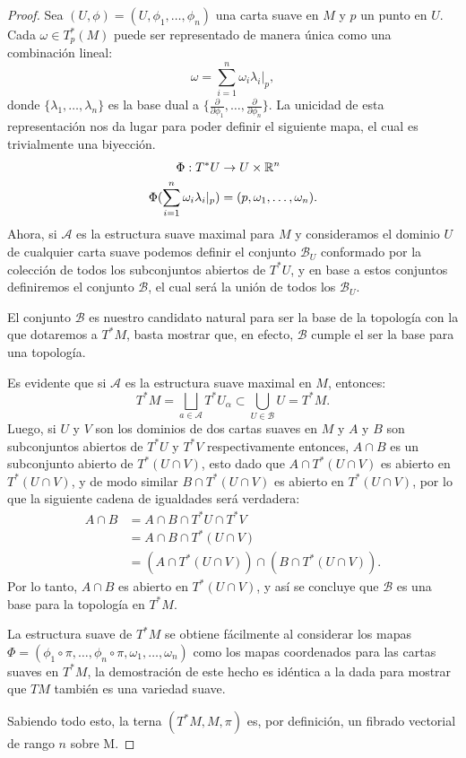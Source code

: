 \begin{proof}
	Sea $(U,\phi) = (U,\phi_1, \ldots, \phi_n)$ una carta suave en $M$ y $p$ un punto en $U$. Cada $\omega \in T_{p}^{*}(M)$ puede ser representado de manera única como una combinación lineal:
	\[
		\omega = \sum_{i=1}^{n} \omega_i \lambda_i |_p,
	\]
	donde $\{\lambda_1, \ldots, \lambda_n \}$ es la base dual a $\{\frac{\partial}{\partial \phi_1}, \ldots, \frac{\partial}{\partial \phi_n}\}$. La unicidad de esta representación nos da lugar para poder definir el siguiente mapa, el cual es trivialmente una biyección.
	\begin{align*}
		\Phi: T^*U                                   & \to U \times \mathbb{R}^n \\
		\Phi( \sum_{i=1}^{n} \omega_i \lambda_i |_p) & =
		(p, \omega_1, \ldots, \omega_n).
	\end{align*}
	Ahora, si $\mathcal{A}$ es la estructura suave maximal para $M$ y consideramos el dominio $U$ de cualquier carta suave podemos definir el conjunto $\mathcal{B}_U$ conformado por la colección de todos los subconjuntos abiertos de $T^{*}U$, y en base a estos conjuntos definiremos el conjunto $\mathcal{B}$, el cual será la unión de todos los $\mathcal{B}_U$.

	El conjunto $\mathcal{B}$ es nuestro candidato natural para ser la base de la topología con la que dotaremos a $T^{*}M$, basta mostrar que, en efecto, $\mathcal{B}$ cumple el ser la base para una topología.

	Es evidente que si $\mathcal{A}$ es la estructura suave maximal en $M$, entonces:
	\[
    T^{*}M = \bigsqcup_{a \in \mathcal{A}} T^{*}U_{\alpha}
    \subset \bigcup_{U \in \mathcal{B}} U = T^*M.
	\]
	Luego, si $U$ y $V$ son los dominios de dos cartas suaves en $M$ y $A$ y $B$ son subconjuntos abiertos de $T^{*}U$ y $T^{*}V$ respectivamente entonces, $A \cap B$ es un subconjunto abierto de $T^{*}(U \cap V)$, esto dado que $A \cap T^{*}(U \cap V)$ es abierto en $T^{*}(U \cap V)$, y de modo similar $B \cap T^{*}(U \cap V)$ es abierto en $T^{*}(U \cap V)$, por lo que la siguiente cadena de igualdades será verdadera:
	\begin{align*}
		A \cap B & = A \cap B \cap T^{*}U \cap T^{*}V                       \\
		         & = A \cap B \cap T^{*}(U \cap V)                          \\
		         & = (A \cap T^{*}(U \cap V)) \cap (B \cap T^{*}(U \cap V)).
	\end{align*}
  Por lo tanto, $A \cap B$ es abierto en $T^{*}(U \cap V)$, y así se concluye que $\mathcal{B}$ es una base para la topología en $T^{*}M$.

  La estructura suave de $T^{*}M$ se obtiene fácilmente al considerar los mapas $\Phi = (\phi_1 \circ \pi, \ldots, \phi_n \circ \pi, \omega_1, \ldots, \omega_n)$ como los mapas coordenados para las cartas suaves en $T^{*}M$, la demostración de este hecho es idéntica a la dada para mostrar que $TM$ también es una variedad suave.

  Sabiendo todo esto, la terna $(T^{*}M, M, \pi)$ es, por definición, un fibrado vectorial de rango $n$ sobre M.
\end{proof}

